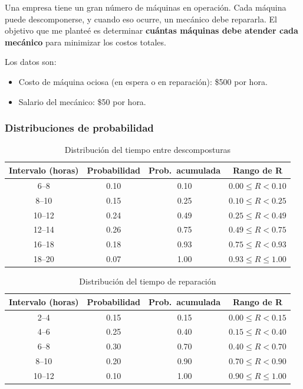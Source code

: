 \documentclass[12pt,a4paper]{article}
\begin{document}
Una empresa tiene un gran número de máquinas en operación. Cada máquina puede descomponerse, y cuando eso ocurre, un mecánico debe repararla. El objetivo que me planteé es determinar \textbf{cuántas máquinas debe atender cada mecánico} para minimizar los costos totales.

Los datos son:

\begin{itemize}
  \item Costo de máquina ociosa (en espera o en reparación): \$500 por hora.
  \item Salario del mecánico: \$50 por hora.
\end{itemize}

\subsubsection{Distribuciones de probabilidad}

\begin{table}[H]
\centering
\caption{Distribución del tiempo entre descomposturas}
\begin{tabular}{cccc}
\toprule
\textbf{Intervalo (horas)} & \textbf{Probabilidad} & \textbf{Prob.\ acumulada} & \textbf{Rango de R} \\
\midrule
6--8   & 0.10 & 0.10 & $0.00 \leq R < 0.10$ \\
8--10  & 0.15 & 0.25 & $0.10 \leq R < 0.25$ \\
10--12 & 0.24 & 0.49 & $0.25 \leq R < 0.49$ \\
12--14 & 0.26 & 0.75 & $0.49 \leq R < 0.75$ \\
16--18 & 0.18 & 0.93 & $0.75 \leq R < 0.93$ \\
18--20 & 0.07 & 1.00 & $0.93 \leq R \leq 1.00$ \\
\bottomrule
\end{tabular}
\end{table}

\begin{table}[H]
\centering
\caption{Distribución del tiempo de reparación}
\begin{tabular}{cccc}
\toprule
\textbf{Intervalo (horas)} & \textbf{Probabilidad} & \textbf{Prob.\ acumulada} & \textbf{Rango de R} \\
\midrule
2--4   & 0.15 & 0.15 & $0.00 \leq R < 0.15$ \\
4--6   & 0.25 & 0.40 & $0.15 \leq R < 0.40$ \\
6--8   & 0.30 & 0.70 & $0.40 \leq R < 0.70$ \\
8--10  & 0.20 & 0.90 & $0.70 \leq R < 0.90$ \\
10--12 & 0.10 & 1.00 & $0.90 \leq R \leq 1.00$ \\
\bottomrule
\end{tabular}
\end{table}
\end{document}
